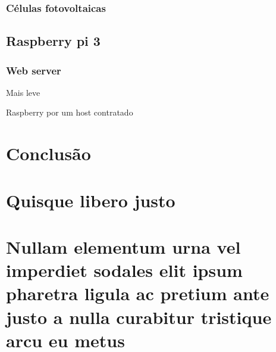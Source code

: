\documentclass[
12pt,				%
openany,			%
twoside,			%
a4paper,			%
english,			%
french,				%
spanish,			%
brazil,				%
]{abntex2}
\begin{document}
\subsection{Células fotovoltaicas}

\section{Raspberry pi 3}
\subsection{Web server}
Mais leve

Raspberry por um host contratado

\chapter{Conclusão}

\lipsum[31-33]

\postextual



%
%


\begin{apendicesenv}

    \partapendices

    \chapter{Quisque libero justo}

    \lipsum[50]

    \chapter{Nullam elementum urna vel imperdiet sodales elit ipsum pharetra ligula
    ac pretium ante justo a nulla curabitur tristique arcu eu metus}
    \lipsum[55-57]

\end{apendicesenv}
\end{document}
